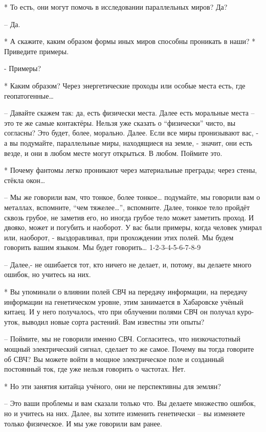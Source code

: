  * То есть, они могут помочь в исследовании параллельных миров? Да?

 – Да.

 * А скажите, каким образом формы иных миров способны проникать в наши?
 * Приведите примеры.

 - Примеры?

 * Каким образом? Через энергетические проходы или особые места есть, где геопатогенные…

 – Давайте скажем так: да, есть физически места. Далее есть моральные места – это те же самые контактёры. Нельзя уже сказать о “физически” чисто, вы согласны? Это будет, более, морально. Далее. Если все миры пронизывают вас, - а вы подумайте, параллельные миры, находящиеся на земле, - значит, они есть везде, и они в любом месте могут открыться. В  любом. Поймите это.

 * Почему фантомы легко проникают через материальные преграды; через стены, стёкла окон…

 – Мы же говорили вам, что тонкое, более тонкое… подумайте, мы говорили вам о металлах, вспомните, “чем тяжелее…”, вспомните. Далее, тонкое тело пройдёт сквозь грубое, не заметив его, но иногда грубое тело может заметить проход. И двояко, может и погубить и наоборот. У вас были примеры, когда человек умирал или, наоборот, - выздоравливал, при прохождении этих полей. Мы будем говорить вашим языком. Мы будет говорить…
 1-2-3-4-5-6-7-8-9

 – Далее,- не ошибается тот, кто ничего не делает, и, потому, вы делаете много ошибок, но учитесь на них.

 * Вы упоминали о влиянии полей СВЧ на передачу информации, на передачу информации на генетическом уровне, этим занимается в Хабаровске учёный  китаец. И у него получалось, что при облучении полями СВЧ он получал куро-уток, выводил новые сорта растений. Вам известны эти опыты?

 – Поймите, мы не говорили именно СВЧ. Согласитесь, что низкочастотный мощный электрический сигнал, сделает то же самое. Почему вы тогда говорите об СВЧ? Вы можете войти в мощное электрическое поле и созданный постоянный ток, где уже нельзя говорить о частотах. Нет.

 * Но эти занятия китайца учёного, они не перспективны для землян?

 – Это ваши проблемы и вам сказали только что. Вы делаете множество ошибок, но и учитесь на них. Далее, вы хотите изменить генетически – вы изменяете только физическое. И мы уже говорили вам ранее.

